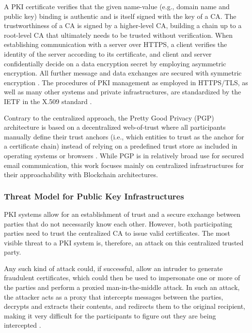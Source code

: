 A PKI certificate verifies that the given name-value (e.g., domain name and public key) binding is authentic and is itself signed with the key of a CA. The trustworthiness of a CA is signed by a higher-level CA, building a chain up to a root-level CA that ultimately needs to be trusted without verification. When establishing communication with a server over HTTPS, a client verifies the identity of the server according to its certificate, and client and server confidentially decide on a data encryption secret by employing asymmetric encryption. All further message and data exchanges are secured with symmetric encryption \cite{straub_tobias_usability_2006}. The procedures of PKI management as employed in HTTPS/TLS, as well as many other systems and private infrastructures, are standardized by the IETF in the X.509 standard \cite{adams_internet_2015}.

Contrary to the centralized approach, the Pretty Good Privacy (PGP) architecture is based on a decentralized web-of-trust where all participants manually define their trust anchors (i.e., which entities to trust as the anchor for a certificate chain) instead of relying on a predefined trust store as included in operating systems or browsers \cite{straub_tobias_usability_2006}. While PGP is in relatively broad use for secured email communication, this work focuses mainly on centralized infrastructures for their approachability with Blockchain architectures.


\subsubsection{Threat Model for Public Key Infrastructures}
\label{subsubsec:threat_model_pki}

PKI systems allow for an establishment of trust and a secure exchange between parties that do not necessarily know each other. However, both participating parties need to trust the centralized CA to issue valid certificates. The most visible threat to a PKI system is, therefore, an attack on this centralized trusted party.

Any such kind of attack could, if successful, allow an intruder to generate fraudulent certificates, which could then be used to impersonate one or more of the parties and perform a proxied man-in-the-middle attack. In such an attack, the attacker acts as a proxy that intercepts messages between the parties, decrypts and extracts their contents, and redirects them to the original recipient, making it very difficult for the participants to figure out they are being intercepted \cite{zusman_criminal_2008}.


